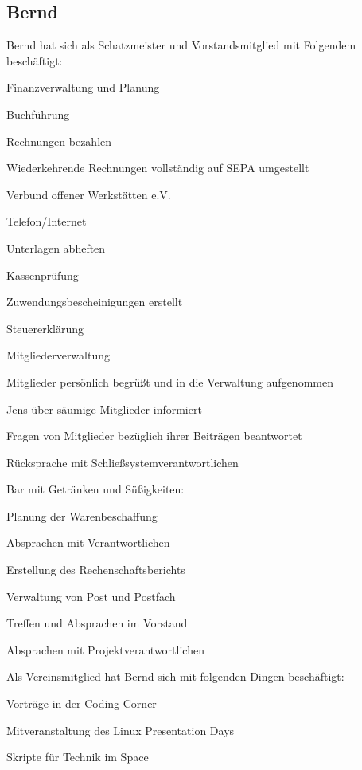 \documentclass[ngerman]{scrartcl}
\begin{document}
\subsection{Bernd}
Bernd hat sich als Schatzmeister und Vorstandsmitglied mit Folgendem beschäftigt:
\begin{compactitem}
	\item Finanzverwaltung und Planung
	\begin{compactitem}
		\item Buchführung
		\item Rechnungen bezahlen
		\item Wiederkehrende Rechnungen vollständig auf SEPA umgestellt
		\begin{compactitem}
			\item Verbund offener Werkstätten e.V.
			\item Telefon/Internet
		\end{compactitem}
		\item Unterlagen abheften
		\item Kassenprüfung
		\item Zuwendungsbescheinigungen erstellt
		\item Steuererklärung
	\end{compactitem}
	\item Mitgliederverwaltung
	\begin{compactitem}
		\item Mitglieder persönlich begrüßt und in die Verwaltung aufgenommen
		\item Jens über säumige Mitglieder informiert
		\item Fragen von Mitglieder bezüglich ihrer Beiträgen beantwortet
		\item Rücksprache mit Schließsystemverantwortlichen
	\end{compactitem}
	\item Bar mit Getränken und Süßigkeiten:
	\begin{compactitem}
		\item Planung der Warenbeschaffung
		\item Absprachen mit Verantwortlichen
	\end{compactitem}
	\item Erstellung des Rechenschaftsberichts
	\item Verwaltung von Post und Postfach
	\item Treffen und Absprachen im Vorstand
	\item Absprachen mit Projektverantwortlichen
\end{compactitem}

Als Vereinsmitglied hat Bernd sich mit folgenden Dingen beschäftigt: 
\begin{compactitem}
	\item Vorträge in der Coding Corner
	\item Mitveranstaltung des Linux Presentation Days
	\item Skripte für Technik im Space
\end{compactitem}
\end{document}
